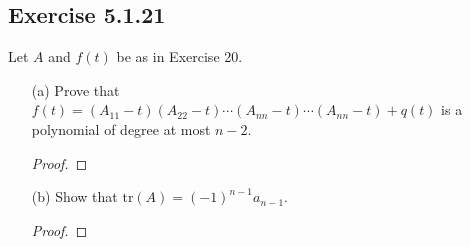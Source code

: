 \subsection*{Exercise 5.1.21} Let \( A  \) and \( f(t)  \) be as in Exercise 20.
\begin{enumerate}
    \item[(a)] Prove that \( f(t) = ({A}_{11} - t)({A}_{22} - t) \cdots ({A}_{n n } - t) \cdots ({A}_{n n } - t) + q(t) \) is a polynomial of degree at most \( n - 2  \). 
        \begin{proof}
        
        \end{proof}
    \item[(b)] Show that \( \text{tr}(A) = (-1)^{n-1} {a}_{n-1} \).
        \begin{proof}
        
        \end{proof}
\end{enumerate}
